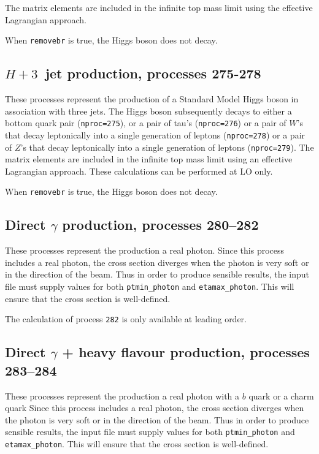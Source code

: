 The matrix elements are included in the infinite top mass limit
using the effective Lagrangian approach. 

When {\tt removebr} is true, the Higgs boson does not decay.

\subsection{$H + 3$~jet production, processes 275-278}

These processes represent the production of a Standard Model Higgs boson
in association with three jets. The Higgs boson
subsequently decays to either a bottom quark pair ({\tt nproc=275}), 
or a pair of tau's ({\tt nproc=276})
or a pair of $W$'s that decay leptonically into a single generation of leptons ({\tt nproc=278})
or a pair of $Z$'s that decay leptonically into a single generation of leptons ({\tt nproc=279}).
The matrix elements are included in the infinite top mass limit
using an effective Lagrangian approach. These calculations can be
performed at LO only.

When {\tt removebr} is true, the Higgs boson does not decay.

\subsection{Direct $\gamma$ production, processes 280--282}
\label{subsec:dirphot}

These processes represent the production a real photon.
Since this process includes a real photon, the cross section diverges
when the photon is very soft or in the direction of the beam.
Thus in order to produce sensible results, the input file must supply values for both
{\tt ptmin\_photon} and {\tt etamax\_photon}. This will ensure that
the cross section is well-defined.

The calculation of process {\tt 282} is only available at leading order.

\subsection{Direct $\gamma$ + heavy flavour production, processes 283--284}
\label{subsec:heavyfl}

These processes represent the production a real photon with a $b$ quark
or a charm quark
Since this process includes a real photon, the cross section diverges
when the photon is very soft or in the direction of the beam.
Thus in order to produce sensible results, the input file must supply values for both
{\tt ptmin\_photon} and {\tt etamax\_photon}. This will ensure that
the cross section is well-defined.

